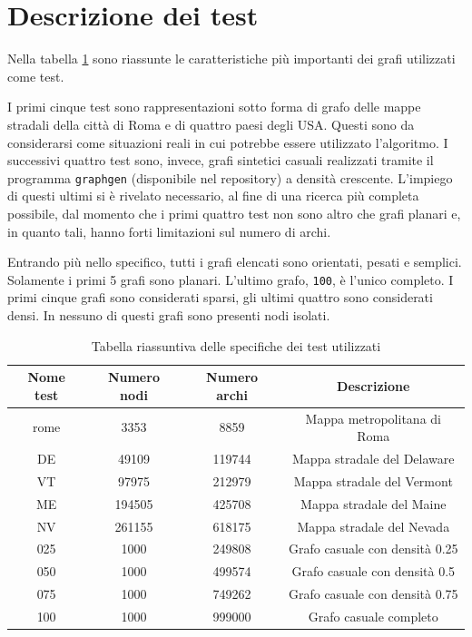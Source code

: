\documentclass[12pt,a4paper]{book}
\begin{document}
	\section{Descrizione dei test}
	Nella tabella \ref{tab:riassunto_test} sono riassunte le caratteristiche più importanti dei grafi utilizzati come test.
	
	I primi cinque test sono rappresentazioni sotto forma di grafo delle mappe stradali della città di Roma e di quattro paesi degli USA. Questi sono da considerarsi come situazioni reali in cui potrebbe essere utilizzato l'algoritmo. I successivi quattro test sono, invece, grafi sintetici casuali realizzati tramite il programma \texttt{graphgen} (disponibile nel repository) a densità crescente. L'impiego di questi ultimi si è rivelato necessario, al fine di una ricerca più completa possibile, dal momento che i primi quattro test non sono altro che grafi planari e, in quanto tali, hanno forti limitazioni sul numero di archi.
	
	Entrando più nello specifico, tutti i grafi elencati sono orientati, pesati e semplici. Solamente i primi 5 grafi sono planari. L'ultimo grafo, \texttt{100}, è l'unico completo. I primi cinque grafi sono considerati sparsi, gli ultimi quattro sono considerati densi. In nessuno di questi grafi sono presenti nodi isolati.
	\begin{table}[!ht]
		\centering
		\begin{tabular}{|c|c|c|c|}
			\hline
			\textbf{Nome test} & \textbf{Numero nodi} & \textbf{Numero archi} & \textbf{Descrizione} \\ \hline
			rome & 3353 & 8859 & Mappa metropolitana di Roma \\ \hline
			DE & 49109 & 119744 & Mappa stradale del Delaware \\ \hline
			VT & 97975 & 212979 & Mappa stradale del Vermont \\ \hline
			ME & 194505 & 425708 & Mappa stradale del Maine \\ \hline
			NV & 261155 & 618175 & Mappa stradale del Nevada \\ \hline
			025 & 1000 & 249808 & Grafo casuale con densità 0.25 \\ \hline
			050 & 1000 & 499574 & Grafo casuale con densità 0.5 \\ \hline
			075 & 1000 & 749262 & Grafo casuale con densità 0.75 \\ \hline
			100 & 1000 & 999000 & Grafo casuale completo \\ \hline
		\end{tabular}
		\caption{Tabella riassuntiva delle specifiche dei test utilizzati}
		\label{tab:riassunto_test}
	\end{table}
	
\end{document}
